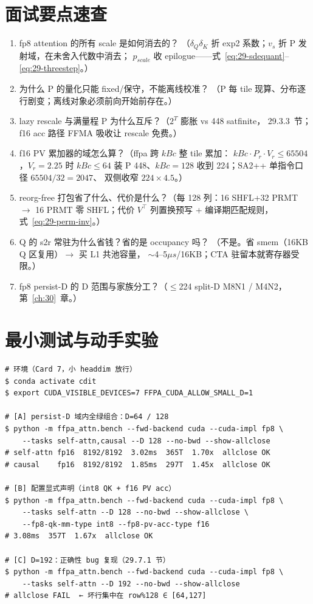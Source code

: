 \section{面试要点速查}

\begin{enumerate}[itemsep=1pt,topsep=2pt]
  \item fp8 attention 的所有 scale 是如何消去的？
        （$\delta_Q\delta_K$ 折 exp2 系数；$v_s$ 折 P 发射域，在未舍入代数中消去；
        $p_{scale}$ 收 epilogue——式~\ref{eq:29-sdequant}--\ref{eq:29-threestep}。）
  \item 为什么 P 的量化只能 fixed/保守，不能离线校准？
        （P 每 tile 现算、分布逐行剧变；离线对象必须前向开始前存在。）
  \item lazy rescale 与满量程 P 为什么互斥？（$2^T$ 膨胀 vs 448 satfinite，
        29.3.3~节；f16 acc 路径 FFMA 吸收让 rescale 免费。）
  \item f16 PV 累加器的域怎么算？（ffpa 跨 $kBc$ 整 tile 累加：
        $kBc\cdot P_r\cdot V_r\le65504$，$V_r=2.25$ 时 $kBc{\le}64$ 装
        P 448、$kBc{=}128$ 收到 224；SA2++ 单指令口径 $65504/32=2047$、
        双侧收窄 $224\times4.5$。）
  \item reorg-free 打包省了什么、代价是什么？（每 128 列：16 SHFL+32 PRMT $\to$
        16 PRMT 零 SHFL；代价 $V^{\top}$ 列置换预写 + 编译期匹配规则，
        式~\ref{eq:29-perm-inv}。）
  \item Q 的 s2r 常驻为什么省钱？省的是 occupancy 吗？
        （不是。省 smem（16KB Q 区复用）$\to$ 买 L1 共池容量，
        $\sim$4--5$\mu s$/16KB；CTA 驻留本就寄存器受限。）
  \item fp8 persist-D 的 D 范围与家族分工？（$\le$224 %
        split-D M8N1 / M4N2，第~\ref{ch:30}~章。）
\end{enumerate}

\section{最小测试与动手实验}

\begin{lstlisting}[style=console]
# 环境（Card 7，小 headdim 放行）
$ conda activate cdit
$ export CUDA_VISIBLE_DEVICES=7 FFPA_CUDA_ALLOW_SMALL_D=1

# [A] persist-D 域内全绿组合：D=64 / 128
$ python -m ffpa_attn.bench --fwd-backend cuda --cuda-impl fp8 \
    --tasks self-attn,causal --D 128 --no-bwd --show-allclose
# self-attn fp16  8192/8192  3.02ms  365T  1.70x  allclose OK
# causal    fp16  8192/8192  1.85ms  297T  1.45x  allclose OK

# [B] 配置显式声明（int8 QK + f16 PV acc）
$ python -m ffpa_attn.bench --fwd-backend cuda --cuda-impl fp8 \
    --tasks self-attn --D 128 --no-bwd --show-allclose \
    --fp8-qk-mm-type int8 --fp8-pv-acc-type f16
# 3.08ms  357T  1.67x  allclose OK

# [C] D=192：正确性 bug 复现（29.7.1 节）
$ python -m ffpa_attn.bench --fwd-backend cuda --cuda-impl fp8 \
    --tasks self-attn --D 192 --no-bwd --show-allclose
# allclose FAIL  ← 坏行集中在 row%128 ∈ [64,127]
\end{lstlisting}

